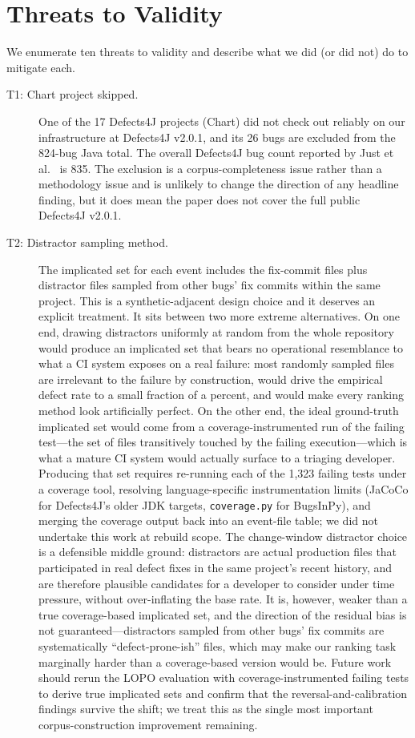 \documentclass[preprint,12pt]{elsarticle}
\begin{document}
\section{Threats to Validity}
\label{sec:threats}

We enumerate ten threats to validity and describe what we did (or did not) do to mitigate each.

\begin{description}
\item[T1: Chart project skipped.] One of the 17 Defects4J projects (Chart) did not check out reliably on our infrastructure at Defects4J v2.0.1, and its 26 bugs are excluded from the 824-bug Java total. The overall Defects4J bug count reported by Just et al.~\cite{just2014defects4j} is 835. The exclusion is a corpus-completeness issue rather than a methodology issue and is unlikely to change the direction of any headline finding, but it does mean the paper does not cover the full public Defects4J v2.0.1.

\item[T2: Distractor sampling method.] The implicated set for each event includes the fix-commit files plus distractor files sampled from other bugs' fix commits within the same project. This is a synthetic-adjacent design choice and it deserves an explicit treatment. It sits between two more extreme alternatives. On one end, drawing distractors uniformly at random from the whole repository would produce an implicated set that bears no operational resemblance to what a CI system exposes on a real failure: most randomly sampled files are irrelevant to the failure by construction, would drive the empirical defect rate to a small fraction of a percent, and would make every ranking method look artificially perfect. On the other end, the ideal ground-truth implicated set would come from a coverage-instrumented run of the failing test---the set of files transitively touched by the failing execution---which is what a mature CI system would actually surface to a triaging developer. Producing that set requires re-running each of the 1{,}323 failing tests under a coverage tool, resolving language-specific instrumentation limits (JaCoCo for Defects4J's older JDK targets, \texttt{coverage.py} for BugsInPy), and merging the coverage output back into an event-file table; we did not undertake this work at rebuild scope. The change-window distractor choice is a defensible middle ground: distractors are actual production files that participated in real defect fixes in the same project's recent history, and are therefore plausible candidates for a developer to consider under time pressure, without over-inflating the base rate. It is, however, weaker than a true coverage-based implicated set, and the direction of the residual bias is not guaranteed---distractors sampled from other bugs' fix commits are systematically ``defect-prone-ish'' files, which may make our ranking task marginally harder than a coverage-based version would be. Future work should rerun the LOPO evaluation with coverage-instrumented failing tests to derive true implicated sets and confirm that the reversal-and-calibration findings survive the shift; we treat this as the single most important corpus-construction improvement remaining.


\end{description}
\end{document}
